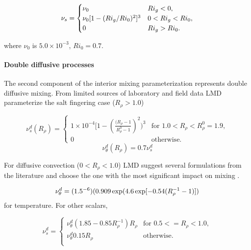 \begin{equation}
\nu_s=\begin{cases}
\nu_0&   \text{$ Ri_g<0$}, \\
\nu_0[1-(Ri_g/Ri_0)^2]^3&  \text{$0< Ri_g<Ri_0$},  \\
0&   \text{$Ri_g>Ri_0$}.  
\end{cases}
\end{equation}

where $\nu_0$ is $5.0 \times 10^{-3}$, $Ri_0 = 0.7$.  

\paragraph{Double diffusive processes}
The second component of the interior mixing parameterization represents
double diffusive mixing.  From limited sources of laboratory and field
data LMD parameterize the salt fingering case ($R_{\rho}>1.0$)

\begin{equation}
\nu_{s}^{d}(R_{\rho})=
	\begin{cases}
1\times10^{-4}[1-(\frac{(R_{\rho}-1}{R_{\rho}^0-1})^2)^{3}&   \text{for $1.0<R_{\rho}<R_{\rho}^0=1.9$},\\
           0& \text{otherwise}.
        \end{cases}
\end{equation}
\begin{equation}
\nu_{\theta}^{d}(R_{\rho})=0.7\nu_{s}^{d}
\end{equation}

For diffusive convection ($0<R_{\rho}<1.0$) LMD suggest several
formulations from the literature and choose the one with the most
significant impact on mixing \citep{Fedorov88}.

\begin{equation}
\nu_{\theta}^{d}=(1.5 \time 10^{-6})(0.909 \exp(4.6 \exp[-0.54(R_{\rho}^{-1}-1)])
\end{equation}
for temperature.  For other scalars,

\begin{equation}
   \nu_{s}^{d}=
	\begin{cases}
	     \nu_{\theta}^{d}(1.85-0.85R_{\rho}^{-1})R_{\rho}& \text{for $0.5<=R_{\rho}<1.0$},\\ 
             \nu_{\theta}^{d}0.15R_{\rho}&  \text{otherwise}. \\
        \end{cases}
\end{equation}

